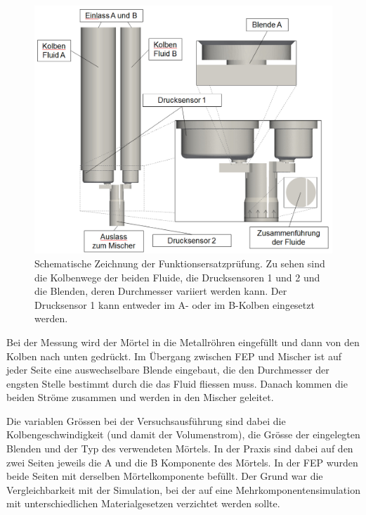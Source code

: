 %
\begin{figure}
    \centering
    \includegraphics[width=\textwidth]{figures/FEP_Schema.png}
    \caption{Schematische Zeichnung der Funktionsersatzprüfung. Zu sehen sind die Kolbenwege der beiden Fluide,
    die Drucksensoren 1 und 2 und die Blenden, deren Durchmesser variiert werden kann. Der Drucksensor 1 kann entweder im A- oder im B-Kolben eingesetzt werden.}
    \label{fig:FEP_schema}
\end{figure}

Bei der Messung wird der Mörtel in die Metallröhren eingefüllt und dann von den Kolben nach unten gedrückt. Im Übergang zwischen FEP und Mischer ist auf jeder Seite eine auswechselbare Blende eingebaut, die den Durchmesser der engsten Stelle bestimmt durch die das Fluid fliessen muss. Danach kommen die beiden Ströme zusammen und werden in den Mischer geleitet.

Die variablen Grössen bei der Versuchsausführung sind dabei die Kolbengeschwindigkeit (und damit der Volumenstrom), die Grösse der eingelegten Blenden und der Typ des verwendeten Mörtels. In der Praxis sind dabei auf den zwei Seiten jeweils die A und die B Komponente des Mörtels.
In der FEP wurden beide Seiten mit derselben Mörtelkomponente befüllt. Der Grund war die Vergleichbarkeit mit der Simulation, bei der auf eine Mehrkomponentensimulation mit unterschiedlichen Materialgesetzen verzichtet werden sollte.

